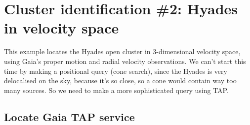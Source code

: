 \documentclass{article}
\begin{document}
\newpage

\section{Cluster identification \#2: Hyades in velocity space}

This example locates the Hyades open cluster in 3-dimensional velocity space,
using Gaia's proper motion and radial velocity observations.
We can't start this time by making a positional query (cone search),
since the Hyades is very delocalised on the sky, because it's so close,
so a cone would contain way too many sources.
So we need to make a more sophisticated query using TAP.

\subsection{Locate Gaia TAP service}
\end{document}
